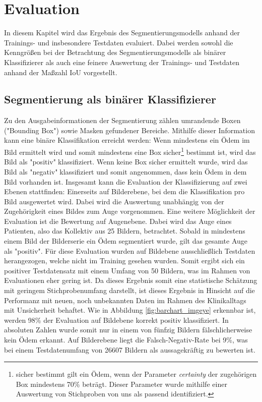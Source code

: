 \newpage
\section{Evaluation}
In diesem Kapitel wird das Ergebnis des Segmentierungsmodells anhand der Trainings- und insbesondere Testdaten evaluiert.\newline
Dabei werden sowohl die Kenngrößen bei der Betrachtung des Segmentierungsmodells als binärer Klassifizierer als auch eine feinere Auswertung der Trainings- und Testdaten anhand der Maßzahl IoU vorgestellt.
% 
\subsection{Segmentierung als binärer Klassifizierer} \label{Segmentierung als binärer Klassifizierer}
Zu den Ausgabeinformationen der Segmentierung zählen umrandende Boxen ("Bounding Box") sowie Masken gefundener Bereiche. Mithilfe dieser Information kann eine binäre Klassifikation erreicht werden: Wenn mindestens ein Ödem im Bild ermittelt wird und somit mindestens eine Box sicher\footnote{sicher bestimmt gilt ein Ödem, wenn der Parameter \textit{certainty} der zugehörigen Box mindestens 70\% beträgt. Dieser Parameter wurde mithilfe einer Auswertung von Stichproben von uns als passend identifiziert.} bestimmt ist, wird das Bild als "positiv"$\;$klassifiziert. Wenn keine Box sicher ermittelt wurde, wird das Bild als "negativ"$\;$klassifiziert und somit angenommen, dass kein Ödem in dem Bild vorhanden ist.\newline
Insgesamt kann die Evaluation der Klassifizierung auf zwei Ebenen stattfinden: Einerseits auf Bilderebene, bei dem die Klassifikation pro Bild ausgewertet wird. Dabei wird die Auswertung unabhängig von der Zugehörigkeit eines Bildes zum Auge vorgenommen.
Eine weitere Möglichkeit der Evaluation ist die Bewertung auf Augenebene. Dabei wird das Auge eines Patienten, also das Kollektiv aus 25 Bildern, betrachtet. Sobald in mindestens einem Bild der Bilderserie ein Ödem segmentiert wurde, gilt das gesamte Auge als "positiv". \newline
Für diese Evaluation wurden auf Bildebene ausschließlich Testdaten herangezogen, welche nicht im Training gesehen wurden. Somit ergibt sich ein positiver Testdatensatz mit einem Umfang von 50 Bildern, was im Rahmen von Evaluationen eher gering ist. Da dieses Ergebnis somit eine statistische Schätzung mit geringem Stichprobenumfang darstellt, ist dieses Ergebnis in Hinsicht auf die Performanz mit neuen, noch unbekannten Daten im Rahmen des Klinikalltags mit Unsicherheit behaftet.\newline
Wie in Abbildung \ref{fig:barchart_imgeye} erkennbar ist, werden 98\% der Evaluation auf Bildebene korrekt positiv klassifiziert. In absoluten Zahlen wurde somit nur in einem von fünfzig Bildern fälschlicherweise kein Ödem erkannt. \newline
Auf Bilderebene liegt die Falsch-Negativ-Rate bei 9\%, was bei einem Testdatenumfang von 26607 Bildern als aussagekräftig zu bewerten ist.

